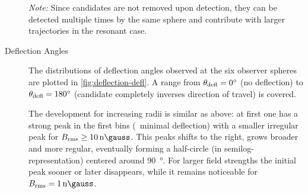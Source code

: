 \begin{description}
        \emph{Note:} Since candidates are not removed upon detection, they can
        be detected multiple times by the same sphere and contribute with
        larger trajectories in the resonant case.

    \item[Deflection Angles]
        The distributions of deflection angles observed at the six observer
        spheres are plotted in \cref{fig:deflection-defl}. A range from
        $\theta_{\mathrm{defl}}=\SI{0}{\degree}$ (no deflection) to
        $\theta_{\mathrm{defl}}=\SI{180}{\degree}$ (candidate completely inverses direction
        of travel) is covered.

        The development for increasing radii is similar as above: at first one
        has a strong peak in the first bins (\ie~minimal deflection) with a
        smaller irregular peak for $\Brms\ge\SI{10}{\nano\gauss}$. This peaks
        shifts to the right, grows broader and more regular, eventually forming
        a half-circle (in semilog-representation) centered around
        \SI{90}{\degree}.
        For larger field strengths the initial peak sooner or later disappears,
        while it remains noticeable for $\Brms=\SI{1}{\nano\gauss}$.
\end{description}

